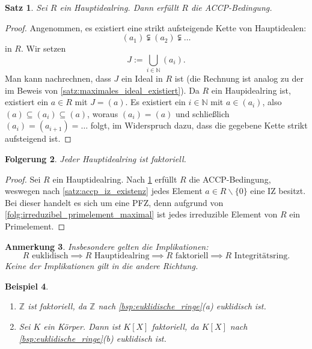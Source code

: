 \documentclass[a4paper, twoside, 11pt, ngerman]{report}
\newcommand{\NN}{\mathds N}
\newcommand{\ZZ}{\mathds Z}
\renewcommand{\setminus}{\smallsetminus}
\theoremstyle{definistyle}
\newtheorem{satz}{Satz}[section]
\newtheorem{anm}[satz]{Anmerkung}
\newtheorem{folgerung}[satz]{Folgerung}
\newtheorem{bsp}[satz]{Beispiel}
\theoremstyle{remark}
\begin{document}
\begin{satz}\label{satz:hir_accp}
Sei $R$ ein Hauptidealring. Dann erfüllt $R$ die ACCP-Bedingung.
\end{satz}
\begin{proof}
Angenommen, es existiert eine strikt aufsteigende Kette von Hauptidealen:
\[
(a_1) \subsetneqq (a_2) \subsetneqq \dots
\]
in $R$. Wir setzen \[J := \bigcup_{i \in \NN} (a_i).\]
Man kann nachrechnen, dass $J$ ein Ideal in $R$ ist (die Rechnung ist analog zu der im Beweis von \ref{satz:maximales_ideal_existiert}).
Da $R$ ein Haupidealring ist, existiert ein $a \in R$ mit $J = (a)$. Es existiert ein $i \in \NN$ mit $a \in (a_i)$, also $(a) \subseteq (a_i) \subseteq (a)$, woraus $(a_i) = (a)$ und schließlich
$(a_i)=(a_{i+1})=\ldots$ folgt, im Widerspruch dazu, dass die gegebene Kette strikt aufsteigend ist.
\end{proof}

\begin{folgerung}\label{folg:hir_faktoriell}
Jeder Hauptidealring ist faktoriell.
\end{folgerung}
\begin{proof}
Sei $R$ ein Hauptidealring. Nach \ref{satz:hir_accp} erfüllt $R$ die ACCP-Bedingung, weswegen nach \ref{satz:accp_iz_existenz} jedes Element $a\in R\setminus\{0\}$ eine IZ besitzt.
Bei dieser handelt es sich um eine PFZ, denn aufgrund von \ref{folg:irreduzibel_primelement_maximal}
ist jedes irreduzible Element von $R$ ein Primelement.
\end{proof}

\begin{anm}\label{anm:implikationen_ringe}
Insbesondere gelten die Implikationen:
\[
R \text{ euklidisch} \implies R \text{ Hauptidealring} \implies R \text{ faktoriell} \implies R \text{ Integritätsring}.
\]
Keine der Implikationen gilt in die andere Richtung.
\end{anm}

\begin{bsp}\label{bsp:faktorielle_ringe}
\begin{enumerate}[label=(\alph*)]
    \item $\ZZ$ ist faktoriell, da $\ZZ$ nach \ref{bsp:euklidische_ringe}(a) euklidisch ist.
    \item Sei $K$ ein Körper. Dann ist $K[X]$ faktoriell, da $K[X]$ nach \ref{bsp:euklidische_ringe}(b) euklidisch ist.
\end{enumerate}
\end{bsp}
\end{document}
